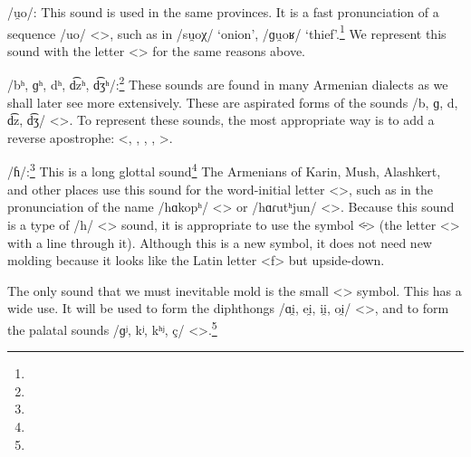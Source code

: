 /u̯o/: This sound is used in the same provinces. It is a fast pronunciation of a sequence /uo/ <>, such as in /su̯oχ/  `onion', /ɡu̯oʁ/  `thief'.\footnote{} We represent this sound with the letter <> for the same reasons above. 

/bʰ, ɡʰ, dʰ, d͡zʰ, d͡ʒʰ/:\footnote{} These sounds are found in many Armenian dialects as we shall later see more extensively. These are aspirated forms of the sounds /b, ɡ, d, d͡z, d͡ʒ/ <>. To represent these sounds, the most appropriate way is to add a reverse apostrophe: <, , , , >. 

/ɦ/:\footnote{} This is a long glottal sound\footnote{} The Armenians of Karin, Mush, Alashkert, and other places use this sound for the word-initial letter <>, such as in the pronunciation of the name /hɑkopʰ/ <> or /hɑɾutʰjun/ <>. Because this sound is a type of /h/ <> sound, it is appropriate to use the symbol <̵> (the letter <> with a line through it). Although this is a new symbol, it does not need new molding because it looks like the Latin letter <f> but upside-down.

The only sound that we must inevitable mold is the small <> symbol. This has a wide use. It will be used to form the diphthongs /ɑi̯, ei̯, ii̯, oi̯/ <>, and to form the palatal sounds /ɡʲ, kʲ, kʰʲ, ç/ <>.\footnote{}

